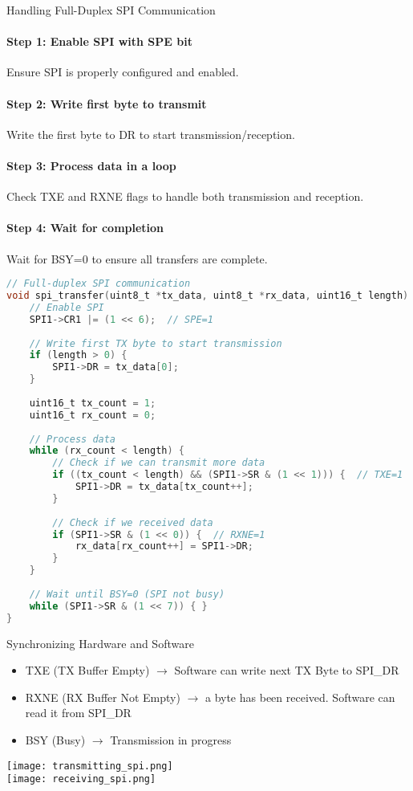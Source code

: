 \begin{KR}{Handling Full-Duplex SPI Communication}
\paragraph{Step 1: Enable SPI with SPE bit}
Ensure SPI is properly configured and enabled.
\paragraph{Step 2: Write first byte to transmit}
Write the first byte to DR to start transmission/reception.
\paragraph{Step 3: Process data in a loop}
Check TXE and RXNE flags to handle both transmission and reception.
\paragraph{Step 4: Wait for completion}
Wait for BSY=0 to ensure all transfers are complete.

\begin{lstlisting}[language=C, style=basesmol]
// Full-duplex SPI communication
void spi_transfer(uint8_t *tx_data, uint8_t *rx_data, uint16_t length) {
    // Enable SPI
    SPI1->CR1 |= (1 << 6);  // SPE=1
    
    // Write first TX byte to start transmission
    if (length > 0) {
        SPI1->DR = tx_data[0];
    }
    
    uint16_t tx_count = 1;
    uint16_t rx_count = 0;
    
    // Process data
    while (rx_count < length) {
        // Check if we can transmit more data
        if ((tx_count < length) && (SPI1->SR & (1 << 1))) {  // TXE=1
            SPI1->DR = tx_data[tx_count++];
        }
        
        // Check if we received data
        if (SPI1->SR & (1 << 0)) {  // RXNE=1
            rx_data[rx_count++] = SPI1->DR;
        }
    }
    
    // Wait until BSY=0 (SPI not busy)
    while (SPI1->SR & (1 << 7)) { }
}
\end{lstlisting}
\end{KR}

\begin{concept}{Synchronizing Hardware and Software}
    \begin{itemize}
        \item TXE (TX Buffer Empty) $\rightarrow$ Software can write next TX Byte to SPI\_DR
        \item RXNE (RX Buffer Not Empty) $\rightarrow$ a byte has been received. Software can read it from SPI\_DR
        \item BSY (Busy) $\rightarrow$ Transmission in progress
    \end{itemize}
    \texttt{[image: transmitting\_spi.png]}\\
    \texttt{[image: receiving\_spi.png]}
\end{concept}
    